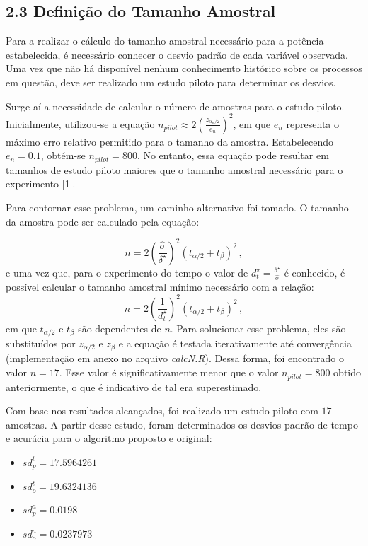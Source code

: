 \documentclass[]{article}
\providecommand{\tightlist}{%
  \setlength{\itemsep}{0pt}\setlength{\parskip}{0pt}}
\begin{document}
\subsection{2.3 Definição do Tamanho
Amostral}\label{definicao-do-tamanho-amostral}

Para a realizar o cálculo do tamanho amostral necessário para a potência
estabelecida, é necessário conhecer o desvio padrão de cada variável
observada. Uma vez que não há disponível nenhum conhecimento histórico
sobre os processos em questão, deve ser realizado um estudo piloto para
determinar os desvios.

Surge aí a necessidade de calcular o número de amostras para o estudo
piloto. Inicialmente, utilizou-se a equação
\(n_{pilot}\approx 2\left(\frac{z_{\alpha_n/2}}{e_{n}}\right)^2\), em
que \(e_{n}\) representa o máximo erro relativo permitido para o tamanho
da amostra. Estabelecendo \(e_{n} = 0.1\), obtém-se \(n_{pilot} = 800\).
No entanto, essa equação pode resultar em tamanhos de estudo piloto
maiores que o tamanho amostral necessário para o experimento {[}1{]}.

Para contornar esse problema, um caminho alternativo foi tomado. O
tamanho da amostra pode ser calculado pela equação:

\[n = 2 \left( \frac{\hat{\sigma}}{\delta^{\star}}\right)^{2}(t_{\alpha/2}+t_{\beta})^{2} \,, \]
e uma vez que, para o experimento do tempo o valor de
\({d^{\star}_{t}} = \frac{\delta^{\star}}{\hat{\sigma}}\) é conhecido, é
possível calcular o tamanho amostral mínimo necessário com a relação:
\[n = 2 \left( \frac{1}{d^{\star}_t}\right)^{2}(t_{\alpha/2}+t_{\beta})^{2} \,,\]
em que \(t_{\alpha/2}\) e \(t_{\beta}\) são dependentes de \(n\). Para
solucionar esse problema, eles são substituídos por \(z_{\alpha/2}\) e
\(z_{\beta}\) e a equação é testada iterativamente até convergência
(implementação em anexo no arquivo \emph{calcN.R}). Dessa forma, foi
encontrado o valor \(n = 17\). Esse valor é significativamente menor que
o valor \(n_{pilot} = 800\) obtido anteriormente, o que é indicativo de
tal era superestimado.

Com base nos resultados alcançados, foi realizado um estudo piloto com
\(17\) amostras. A partir desse estudo, foram determinados os desvios
padrão de tempo e acurácia para o algoritmo proposto e original:

\begin{itemize}
\tightlist
\item
  \(sd_p^t = 17.5964261\)
\item
  \(sd_o^t = 19.6324136\)
\item
  \(sd_p^a = 0.0198\)
\item
  \(sd_o^a = 0.0237973\)
\end{itemize}
\end{document}

